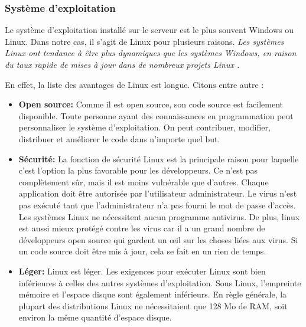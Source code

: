         \subsubsection{Système d'exploitation}
        Le système d'exploitation installé sur le serveur est le plus souvent Windows ou Linux.
        Dans notre cas, il s'agit de Linux pour plusieurs raisons.
        \textit{Les systèmes Linux ont tendance à être plus dynamiques que les 
        systèmes Windows, en raison du taux rapide de mises à jour  
        dans de nombreux projets Linux \cite{ovadia2014linux}.}
        \par
        En effet, la liste des avantages de Linux 
        est longue. Citons entre autre \cite{advlinux} :
        \begin{itemize}
                \item \textbf{Open source: }
                Comme il est open source, son code source est facilement disponible. 
                Toute personne ayant des connaissances en programmation peut personnaliser 
                le système d'exploitation. On peut contribuer, modifier, distribuer et 
                améliorer le code dans n'importe quel but.
                \item \textbf{Sécurité: }
                La fonction de sécurité Linux est la principale raison pour laquelle c'est 
                l'option la plus favorable pour les développeurs. Ce n'est pas complètement 
                sûr, mais il est moins vulnérable que d'autres. Chaque application doit 
                être autorisée par l'utilisateur administrateur. Le virus n'est pas exécuté 
                tant que l'administrateur n'a pas fourni le mot de passe d'accès. Les systèmes 
                Linux ne nécessitent aucun programme antivirus.
                De plus, linux est aussi mieux protégé contre les virus car il a un grand 
                nombre de développeurs open source qui gardent un œil sur les choses liées aux 
                virus. Si un code source doit être mis à jour, cela se fait en un rien de temps.
                \item \textbf{Léger: }
                Linux est léger. Les exigences pour exécuter Linux sont bien inférieures à 
                celles des autres systèmes d'exploitation. Sous Linux, l'empreinte mémoire et 
                l'espace disque sont également inférieurs. En règle générale, 
                la plupart des distributions Linux ne nécessitaient que 128 Mo de RAM, 
                soit environ la même quantité d'espace disque.

\end{itemize}
